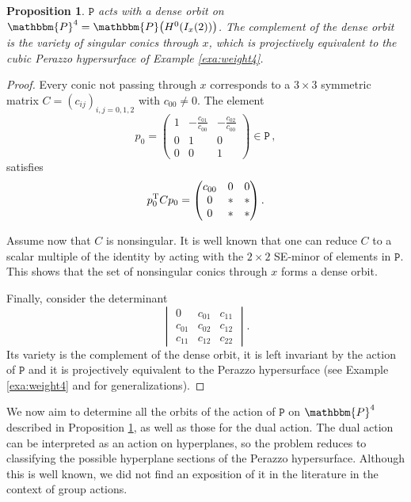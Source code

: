 \documentclass[aps,floatfix,groupedaddress,superscriptaddress,longbibliography,footinbib,notitlepage,showpacs]{revtex4-1}
\newtheorem{proposition}[theorem]{Proposition}
\begin{document}
\begin{proposition}\label{prop:P4prehom}
$\mathtt{P}$ acts with a dense orbit on $\mathbbm{P}^4=\mathbbm{P}\big(H^0(I_x(2))\big)$.
The complement of the dense orbit is the variety of singular conics through $x$,
which is projectively equivalent to the cubic Perazzo hypersurface of Example \ref{exa:weight4}.
\end{proposition}
\begin{proof}
Every conic not passing through $x$ corresponds to a $3\times 3$ symmetric matrix 
$C = (c_{ij})_{i,j=0,1,2}$ with $c_{00} \neq 0$.  
The element
\begin{equation}
p_0 = \begin{pmatrix}
1 & -\frac{c_{01}}{c_{00}} & -\frac{c_{02}}{c_{00}} \\
0 & 1 & 0 \\
0 & 0 & 1
\end{pmatrix} \in \mathtt{P}\,,
\end{equation}
satisfies
\begin{equation}
p_0^{\rm T} C p_0 = \begin{pmatrix}
c_{00} & 0 & 0 \\
0 & * & * \\
0 & * & *
\end{pmatrix}.
\end{equation}

Assume now that $C$ is nonsingular. It is well known that one can reduce $C$ to a scalar multiple of the identity by acting with the $2\times 2$ SE-minor of elements in $\mathtt{P}$. This shows that the set of nonsingular conics through $x$ forms a dense orbit.  

Finally, consider the determinant
\begin{equation}\label{eq:perazzo}
\begin{vmatrix}
0 & c_{01} & c_{11} \\
c_{01} & c_{02} & c_{12} \\
c_{11} & c_{12} & c_{22}
\end{vmatrix}.
\end{equation}
Its variety is the complement of the dense orbit, it is left invariant by the action of $\mathtt{P}$ and it is projectively equivalent to the Perazzo hypersurface (see Example \ref{exa:weight4} and \cite[\S 7.4]{Ru} for generalizations).
\end{proof}


We now aim to determine all the orbits of the action of $\mathtt{P}$ on $\mathbbm{P}^4$ described in Proposition \ref{prop:P4prehom}, as well as those for the dual action.   The dual action can be interpreted as an action on hyperplanes, so the problem reduces to classifying the possible hyperplane sections of the Perazzo hypersurface. Although this is well known, we did not find an exposition of it in the literature in the context of group actions.
\end{document}
